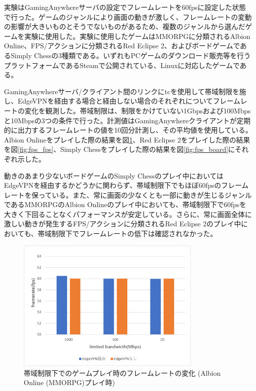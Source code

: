 実験はGamingAnywhereサーバの設定でフレームレートを60fpsに設定した状態で行った。ゲームのジャンルにより画面の動きが激しく、フレームレートの変動の影響が大きいものとそうでないものがあるため、複数のジャンルから選んだゲームを実験に使用した。実験に使用したゲームはMMORPGに分類されるAlbion Online\cite{albiononline}、FPS/アクションに分類されるRed Eclipse 2\cite{redeclipse}、およびボードゲームであるSimply Chess\cite{simplychess}の3種類である。いずれもPCゲームのダウンロード販売等を行うプラットフォームであるSteam\cite{steam}で公開されている、Linuxに対応したゲームである。

GamingAnywhereサーバ/クライアント間のリンクにtcを使用して帯域制限を施し、EdgeVPNを経由する場合と経由しない場合のそれぞれについてフレームレートの変化を観測した。帯域制限は、制限をかけていない1Gbpsおよび100Mbpsと10Mbpsの3つの条件で行った。計測値はGamingAnywhereクライアントが定期的に出力するフレームレートの値を10回分計測し、その平均値を使用している。Albion Onlineをプレイした際の結果を図\ref{fig:fps_mmo}、Red Eclipse 2をプレイした際の結果を図\ref{fig:fps_fps}、Simply Chessをプレイした際の結果を図\ref{fig:fps_board}にそれぞれ示した。

動きのあまり少ないボードゲームのSimply Chessのプレイ中においてはEdgeVPNを経由するかどうかに関わらず、帯域制限下でもほぼ60fpsのフレームレートを保っている。また、常に画面の少なくとも一部に動きが生じるジャンルであるMMORPGのAlbion Onlineのプレイ中においても、帯域制限下で60fpsを大きく下回ることなくパフォーマンスが安定している。さらに、常に画面全体に激しい動きが発生するFPS/アクションに分類されるRed Eclipse 2のプレイ中においても、帯域制限下でフレームレートの低下は確認されなかった。

\begin{figure}[t]
    \centering
    \includegraphics[width=0.8\textwidth,keepaspectratio,clip]{img/framerate_MMO.pdf}
    \caption{帯域制限下でのゲームプレイ時のフレームレートの変化 (Albion Online (MMORPG)プレイ時)}
    \label{fig:fps_mmo}
\end{figure}

